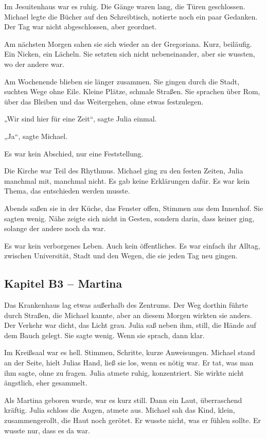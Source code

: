 \documentclass[
]{article}
\begin{document}
Im Jesuitenhaus war es ruhig. Die Gänge waren lang, die Türen geschlossen. Michael legte die Bücher auf den Schreibtisch, notierte noch ein paar Gedanken. Der Tag war nicht abgeschlossen, aber geordnet.

Am nächsten Morgen sahen sie sich wieder an der Gregoriana. Kurz, beiläufig. Ein Nicken, ein Lächeln. Sie setzten sich nicht nebeneinander, aber sie wussten, wo der andere war.

Am Wochenende blieben sie länger zusammen. Sie gingen durch die Stadt, suchten Wege ohne Eile. Kleine Plätze, schmale Straßen. Sie sprachen über Rom, über das Bleiben und das Weitergehen, ohne etwas festzulegen.

„Wir sind hier für eine Zeit``, sagte Julia einmal.

„Ja``, sagte Michael.

Es war kein Abschied, nur eine Feststellung.

Die Kirche war Teil des Rhythmus. Michael ging zu den festen Zeiten, Julia manchmal mit, manchmal nicht. Es gab keine Erklärungen dafür. Es war kein Thema, das entschieden werden musste.

Abends saßen sie in der Küche, das Fenster offen, Stimmen aus dem Innenhof. Sie sagten wenig. Nähe zeigte sich nicht in Gesten, sondern darin, dass keiner ging, solange der andere noch da war.

Es war kein verborgenes Leben. Auch kein öffentliches. Es war einfach ihr Alltag, zwischen Universität, Stadt und den Wegen, die sie jeden Tag neu gingen.

\subsection{Kapitel B3 -- Martina}\label{kapitel-b3-martina}

Das Krankenhaus lag etwas außerhalb des Zentrums. Der Weg dorthin führte durch Straßen, die Michael kannte, aber an diesem Morgen wirkten sie anders. Der Verkehr war dicht, das Licht grau. Julia saß neben ihm, still, die Hände auf dem Bauch gelegt. Sie sagte wenig. Wenn sie sprach, dann klar.

Im Kreißsaal war es hell. Stimmen, Schritte, kurze Anweisungen. Michael stand an der Seite, hielt Julias Hand, ließ sie los, wenn es nötig war. Er tat, was man ihm sagte, ohne zu fragen. Julia atmete ruhig, konzentriert. Sie wirkte nicht ängstlich, eher gesammelt.

Als Martina geboren wurde, war es kurz still. Dann ein Laut, überraschend kräftig. Julia schloss die Augen, atmete aus. Michael sah das Kind, klein, zusammengerollt, die Haut noch gerötet. Er wusste nicht, was er fühlen sollte. Er wusste nur, dass es da war.
\end{document}
